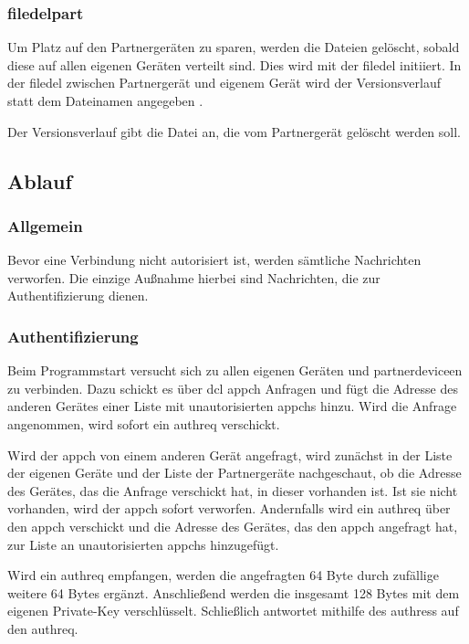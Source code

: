 \subsubsection{\gls{filedelpart}}
Um Platz auf den Partnergeräten zu sparen, werden die Dateien gelöscht, sobald diese auf allen eigenen Geräten verteilt sind. Dies wird mit der \gls{filedel} initiiert. In der \gls{filedel} zwischen Partnergerät und eigenem Gerät wird der Versionsverlauf statt dem Dateinamen angegeben .
\sblitfiledelpartbytefield
\begin{description}
	Der Versionsverlauf gibt die Datei an, die vom Partnergerät gelöscht werden soll. 
\end{description}

\subsection{Ablauf}
\subsubsection{Allgemein}
Bevor eine Verbindung nicht autorisiert ist, werden sämtliche Nachrichten verworfen. Die einzige Außnahme hierbei sind Nachrichten, die zur Authentifizierung dienen. 

\subsubsection{Authentifizierung}
Beim Programmstart versucht sich \sblit zu allen eigenen Geräten und \gls{partnerdevice}en zu verbinden. Dazu schickt es über \gls{dcl} \gls{appch} Anfragen und fügt die Adresse des anderen Gerätes einer Liste mit unautorisierten \gls{appch}s hinzu. Wird die Anfrage angenommen, wird sofort ein \gls{authreq} verschickt. 

Wird der \gls{appch} von einem anderen Gerät angefragt, wird zunächst in der Liste der eigenen Geräte  und der Liste der Partnergeräte  nachgeschaut, ob die Adresse des Gerätes, das die Anfrage verschickt hat, in dieser vorhanden ist. Ist sie nicht vorhanden, wird der \gls{appch} sofort verworfen. Andernfalls wird ein \gls{authreq} über den \gls{appch} verschickt und die Adresse des Gerätes, das den \gls{appch} angefragt hat, zur Liste an unautorisierten \gls{appch}s hinzugefügt.

Wird ein \gls{authreq} empfangen, werden die angefragten 64 Byte durch zufällige weitere 64 Bytes ergänzt. Anschließend werden die insgesamt 128 Bytes mit dem eigenen Private-Key verschlüsselt. Schließlich antwortet \sblit mithilfe des \gls{authres}s auf den \gls{authreq}.

